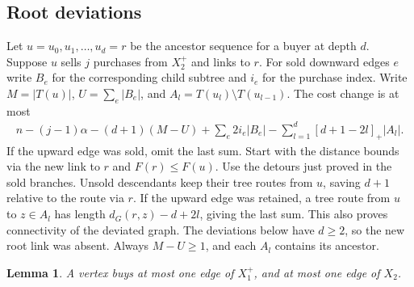 \documentclass[11pt]{article}
\newtheorem{lemma}[theorem]{Lemma}
\newcommand{\dG}{d_G}
\newcommand{\pos}[1]{\left[#1\right]_+}
\newcommand{\abs}[1]{\left|#1\right|}
\begin{document}
\subsection{Root deviations}

Let \(u=u_0,u_1,\ldots,u_d=r\) be the ancestor sequence for a buyer
at depth \(d\). Suppose \(u\) sells \(j\) purchases from \(X_2^+\)
and links to \(r\). For sold downward edges \(e\) write \(B_e\)
for the corresponding child subtree and \(i_e\) for the purchase
index. Write \(M=\abs{T(u)}\), \(U=\sum_e\abs{B_e}\), and
\(A_l=T(u_l)\setminus T(u_{l-1})\). The cost change is at most
\begin{align}
 n-(j-1)\alpha -(d+1)(M-U)
 +\sum_e 2i_e\abs{B_e}
 -\sum_{l=1}^d\pos{d+1-2l}\abs{A_l}.
 \tag{6}\label{eq:root}
\end{align}
If the upward edge was sold, omit the last sum. Start with the
distance bounds via the new link to \(r\) and \(F(r)\le F(u)\).
Use the detours just proved in the sold branches. Unsold descendants
keep their tree routes from \(u\), saving \(d+1\) relative to the
route via \(r\). If the upward edge was retained, a tree route
from \(u\) to \(z\in A_l\) has length \(\dG(r,z)-d+2l\), giving
the last sum. This also proves connectivity of the deviated graph.
The deviations below have \(d\ge2\), so the new root link was
absent. Always \(M-U\ge1\), and each \(A_l\) contains its ancestor.

\begin{lemma}\label{lem:capacities}
A vertex buys at most one edge of \(X_1^+\), and at most one
edge of \(X_2\).
\end{lemma}
\end{document}
